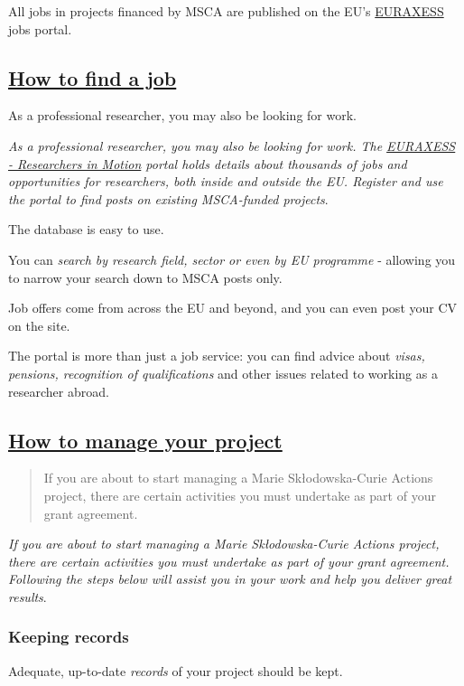 \documentclass[oneside]{book}
\numberwithin{equation}{section}
\begin{document}
All jobs in projects financed by MSCA are published on the EU's \href{https://euraxess.ec.europa.eu/}{EURAXESS} jobs portal.

\subsection{\href{https://ec.europa.eu/research/mariecurieactions/how-to/find-job_en}{How to find a job}}
\begin{center}
    As a professional researcher, you may also be looking for work.
\end{center}
\textit{As a professional researcher, you may also be looking for work. The \href{https://euraxess.ec.europa.eu/}{EURAXESS - Researchers in Motion} portal holds details about thousands of jobs and opportunities for researchers, both inside and outside the EU. Register and use the portal to find posts on existing MSCA-funded projects}.

%
The database is easy to use.

You can \textit{search by research field, sector or even by EU programme} - allowing you to narrow your search down to MSCA posts only.

Job offers come from across the EU and beyond, and you can even post your CV on the site.

%
The portal is more than just a job service: you can find advice about \textit{visas, pensions, recognition of qualifications} and other issues related to working as a researcher abroad.

\subsection{\href{https://ec.europa.eu/research/mariecurieactions/how-to/manage-your-project_en}{How to manage your project}}
\begin{quotation}
    If you are about to start managing a Marie Skłodowska-Curie Actions project, there are certain activities you must undertake as part of your grant agreement.
\end{quotation}
\textit{If you are about to start managing a Marie Skłodowska-Curie Actions project, there are certain activities you must undertake as part of your grant agreement. Following the steps below will assist you in your work and help you deliver great results}.

\subsubsection{Keeping records}
Adequate, up-to-date \textit{records} of your project should be kept.
\end{document}
